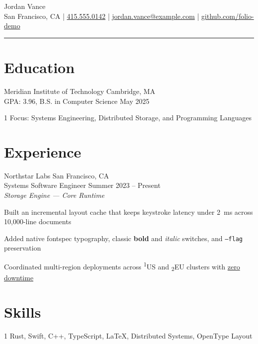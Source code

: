 \documentclass{article}
\newenvironment{itemize*}
    {\begin{spacing}{0}
    \setlist{nolistsep}
    \begin{itemize}[topsep=3pt, leftmargin=*]
    \setlength{\itemsep}{4pt}}
    {\end{itemize} \end{spacing} \vspace{1em}}
\begin{document}
\noindent
\vspace{-1em}
\begin{center}
{\name Jordan Vance}\\
\vspace{0.5em}
{\info
San Francisco, CA |
\href{tel:4155550142}{415.555.0142} |
\href{mailto:jordan.vance@example.com}{jordan.vance@example.com} |
\href{https://github.com/folio-demo}{github.com/folio-demo}}
\rule{\textwidth}{.4pt}
\end{center}
\raggedright
\section*{Education}
{\subhead Meridian Institute of Technology} \hfill {\detail Cambridge, MA}\\
{\detail GPA: 3.96, B.S. in Computer Science} \hfill {\detail May 2025}\\
\begin{spacing}{1}
	Focus: Systems Engineering, Distributed Storage, and Programming Languages\\
\end{spacing}

\section*{Experience}
{\subhead Northstar Labs} \hfill {\detail San Francisco, CA}\\
{\subsubhead Systems Software Engineer} \hfill {\detail Summer 2023 -- Present}\\
\emph{Storage Engine --- Core Runtime}
\begin{itemize*}
	\item Built an incremental layout cache that keeps keystroke latency under 2~ms across 10,000-line documents
	\item Added native \textsf{fontspec} typography, classic {\bf bold} and {\it italic} switches, and \texttt{--flag} preservation
	\item Coordinated multi-region deployments across \textsuperscript{1}US and \textsubscript{2}EU clusters with \uline{zero downtime}
\end{itemize*}

\section*{Skills}
\begin{spacing}{1}
Rust, Swift, C++, TypeScript, \LaTeX, Distributed Systems, OpenType Layout\\
\end{spacing}
\end{document}
